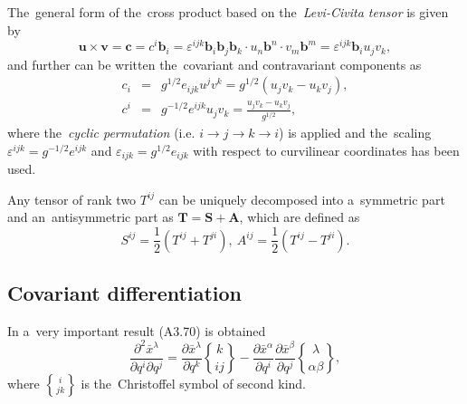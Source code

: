\documentclass[preprint,12pt]{elsarticle}
\newcommand{\pdv}[2]{\frac{\partial{#1}}{\partial{#2}}}
\newcommand{\vect}[1]{\boldsymbol{#1}}
\newcommand{\matr}[1]{\mathbf{#1}}
\newcommand{\christ}[3]{\genfrac{\{}{\}}{0pt}{}{#1}{#2 #3}}
\begin{document}
The~general form of the~cross product 
based on the~\textit{Levi-Civita tensor} is given by
\begin{equation}
  \vect{u}\times\vect{v} = \vect{c} = c^i\vect{b}_i = 
  \varepsilon^{ijk}\vect{b}_i\vect{b}_j\vect{b}_k 
  \cdot u_n\vect{b}^n \cdot v_m\vect{b}^m 
  = \varepsilon^{ijk}\vect{b}_i u_j v_k ,
  \nonumber 
\end{equation}
and further can be written the~covariant and contravariant components as
\begin{eqnarray}
  c_i &=& g^{1/2}e_{ijk}u^j v^k = g^{1/2}(u_j v_k - u_k v_j) ,
  \label{eq:general_covariant_cross_product}\\
  c^i &=& g^{-1/2}e^{ijk}u_j v_k = \frac{u_j v_k - u_k v_j}{g^{1/2}} ,
  \label{eq:general_contravariant_cross_product}
\end{eqnarray}
where the~\textit{cyclic permutation} 
(i.e. $i\rightarrow j \rightarrow k \rightarrow i$) is applied 
and the~scaling $\varepsilon^{ijk} = g^{-1/2}e^{ijk}$ and
$\varepsilon_{ijk} = g^{1/2}e_{ijk}$ with respect to curvilinear coordinates
has been used. 

Any tensor of rank two $T^{ij}$ can be uniquely decomposed into a~symmetric 
part and an~antisymmetric part as $\matr{T} = \matr{S} + \matr{A}$, 
which are defined as
\begin{equation}
  S^{ij} = \frac{1}{2}(T^{ij} + T^{ji}),~
  A^{ij} = \frac{1}{2}(T^{ij} - T^{ji}) .
  \label{eq:matrix_decomposition}
\end{equation}

\subsection{Covariant differentiation}
In \cite{Mihalas_Mihalas-Foundations_of_Radiation_Hydrodynamics} a~very 
important result (A3.70) is obtained
\begin{equation}
  \frac{\partial^2\bar{x}^\lambda}{\partial q^i\partial q^j} = 
  \pdv{\bar{x}^\lambda}{q^k}\christ{k}{i}{j} -
  \pdv{\bar{x}^\alpha}{q^i}\pdv{\bar{x}^\beta}{q^j}
  \christ{\lambda}{\alpha}{\beta} ,
  \label{eq:Christ_result}
\end{equation}
where $\christ{i}{j}{k}$ is the~Christoffel symbol of second kind.
\end{document}
